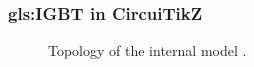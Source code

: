 \begin{frame}
	\frametitle{\gls{gls:IGBT} in CircuiTikZ}
	\begin{figure}[t]
			\begin{center}
					\caption{Topology of the internal  model .}
					\label{fig:IGBT}  
			\end{center}
	\end{figure}
\end{frame}